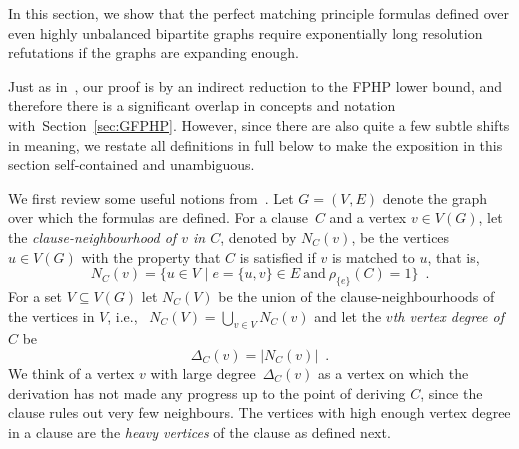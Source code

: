 \documentclass{theoretics}
\newcommand{\set}[1]{\{ #1 \}}
\newcommand{\setdescr}[3][\mid]{\set{ #2 #1 #3 }}
\newcommand{\setsize}[1]{\lvert#1\rvert}
\newcommand{\introduceterm}[1]{{\emph{#1}}}
\newcommand{\eqperiod}{\enspace .}
\newcommand{\ie}{i.e.,\ }
\newcommand{\refsec}[1]{Section~\ref{#1}}
\newcommand{\heavy}{heavy\xspace}
\newcommand{\neigh}[2][]{N_{{#1}}(#2)}
\renewcommand{\deg}[2][XXXXXXXXXXXX]{\Delta_{#1}(#2)}
\newcommand{\V}[1][]{V_{#1}}
\newcommand{\matchboolof}[2]{\rho_{#1}(#2)}
\numberwithin{equation}{section}
\begin{document}
In this section, we show that the perfect matching principle formulas
defined over even highly unbalanced bipartite graphs 
require exponentially long resolution refutations if the graphs are
expanding enough.  


Just as in~\cite{Razborov04ResolutionLowerBoundsPM}, our proof is by an
indirect reduction to the  FPHP lower bound, and therefore there is a
significant overlap in concepts and notation with~\refsec{sec:GFPHP}.
However, since there are also quite a few subtle shifts in meaning, 
we restate all definitions in full below to make the exposition in
this section self-contained and unambiguous.

We first review some useful notions
from~\cite{Razborov01ImprovedResolutionLowerBoundsWPHP}. 
Let
$G = (\V, E)$
denote the graph over which the formulas are defined.
For a 
clause~$C$ and a 
vertex $v \in V(G)$,
let the \introduceterm{clause-neighbourhood of $v$ in $C$}, denoted by $\neigh[C]{v}$,  be
the vertices $u \in V(G)$ with the property that $C$ is satisfied if
$v$ is matched to $u$, that is,
\begin{equation}
	\neigh[C]{v} = \setdescr{ u \in \V }{ e=\set{u, v} \in 
	E~\text{and}~\matchboolof{\set{e}}{C} = 1 } 
   \eqperiod
\end{equation}
For a set $V \subseteq V(G)$ let $\neigh[C]{V}$ be the union of the
clause-neighbourhoods of the vertices in $V$, \ie
$
  \neigh[C]{V} = \bigcup_{v \in V}\neigh[C]{v}
$ and let the \introduceterm{$v$th vertex degree of $C$} be
\begin{equation}
  \deg[C]{v} = \setsize{ \neigh[C]{v} } 
\eqperiod
\end{equation}
We think of a vertex $v$ with large 
degree~$\deg[C]{v}$ 
as a vertex on which the derivation has
not made any progress up to the point of deriving $C$, since the
clause rules out very few
neighbours.
The vertices with high enough vertex degree in a clause are the 
\emph{\heavy vertices} of the clause as defined next.
\end{document}
